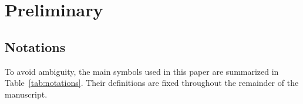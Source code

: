 \section{Preliminary}\label{sec:Preliminary}
    \subsection{Notations}\label{sec:Preliminary:Notations}
        To avoid ambiguity, the main symbols used in this paper are summarized in Table~\ref{tab:notations}. Their definitions are fixed throughout the remainder of the manuscript.

